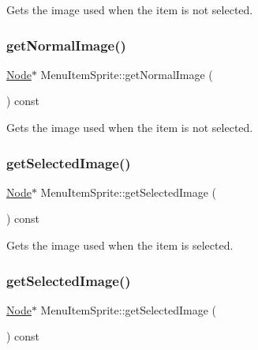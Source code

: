 Gets the image used when the item is not selected. \mbox{\label{classMenuItemSprite_a58e62e7a8c9255d7dddaf1e868637aa3}} 
\subsubsection{\texorpdfstring{get\+Normal\+Image()}{getNormalImage()}\hspace{0.1cm}{\footnotesize\ttfamily [2/2]}}
{\footnotesize\ttfamily \hyperlink{classNode}{Node}$\ast$ Menu\+Item\+Sprite\+::get\+Normal\+Image (\begin{DoxyParamCaption}{ }\end{DoxyParamCaption}) const\hspace{0.3cm}{\ttfamily [inline]}}

Gets the image used when the item is not selected. \mbox{\label{classMenuItemSprite_ae5a5bdcfe21ab32a531633ea2c4275a1}} 
\subsubsection{\texorpdfstring{get\+Selected\+Image()}{getSelectedImage()}\hspace{0.1cm}{\footnotesize\ttfamily [1/2]}}
{\footnotesize\ttfamily \hyperlink{classNode}{Node}$\ast$ Menu\+Item\+Sprite\+::get\+Selected\+Image (\begin{DoxyParamCaption}{ }\end{DoxyParamCaption}) const\hspace{0.3cm}{\ttfamily [inline]}}

Gets the image used when the item is selected. \mbox{\label{classMenuItemSprite_ae5a5bdcfe21ab32a531633ea2c4275a1}} 
\subsubsection{\texorpdfstring{get\+Selected\+Image()}{getSelectedImage()}\hspace{0.1cm}{\footnotesize\ttfamily [2/2]}}
{\footnotesize\ttfamily \hyperlink{classNode}{Node}$\ast$ Menu\+Item\+Sprite\+::get\+Selected\+Image (\begin{DoxyParamCaption}{ }\end{DoxyParamCaption}) const\hspace{0.3cm}{\ttfamily [inline]}}

